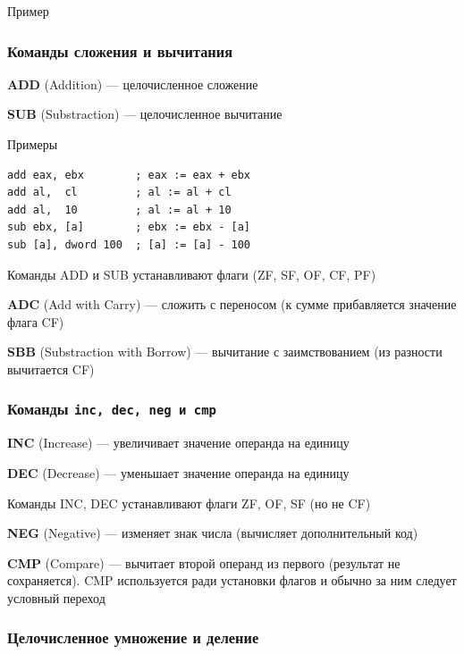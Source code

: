 \documentclass{beamer}
\begin{document}
    \begin{frame}{Пример}
    \end{frame}
    \begin{frame}[fragile]
        \frametitle{Команды сложения и вычитания}
        {\bf ADD} (Addition) --- целочисленное сложение

        {\bf SUB} (Substraction) --- целочисленное вычитание
        \begin{block}{Примеры}
            \begin{verbatim}
add eax, ebx        ; eax := eax + ebx
add al,  cl         ; al := al + cl
add al,  10         ; al := al + 10
sub ebx, [a]        ; ebx := ebx - [a] 
sub [a], dword 100  ; [a] := [a] - 100
            \end{verbatim}
        \end{block}
        Команды ADD и SUB устанавливают флаги (ZF, SF, OF, CF, PF)

        {\bf ADC} (Add with Carry) --- сложить с переносом (к сумме прибавляется значение флага CF)

        {\bf SBB} (Substraction with Borrow) --- вычитание с заимствованием (из разности вычитается CF)
\end{frame}
    \begin{frame}[fragile]
        \frametitle{Команды \tt inc, dec, neg и cmp}
        {\bf INC} (Increase) --- увеличивает значение операнда на единицу

        {\bf DEC} (Decrease) --- уменьшает значение операнда на единицу

        Команды INC, DEC устанавливают флаги ZF, OF, SF (но не CF)

        \bigskip
        {\bf NEG} (Negative) --- изменяет знак числа (вычисляет дополнительный код)

        {\bf CMP} (Compare) --- вычитает второй операнд из первого (результат не сохраняется). CMP используется ради установки флагов и обычно за ним следует условный переход
\end{frame}
    \begin{frame}[fragile]
        \frametitle{Целочисленное умножение и деление}
\end{frame}
\end{document}
